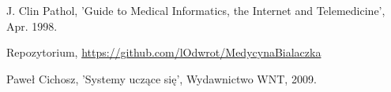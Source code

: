 \begin{thebibliography}{1}
	
	J. Clin Pathol, 'Guide to Medical Informatics, the Internet and Telemedicine', Apr. 1998. 
	
	Repozytorium, \url{https://github.com/lOdwrot/MedycynaBialaczka}
	
	Paweł Cichosz, 'Systemy uczące się', Wydawnictwo WNT, 2009. 
	
\end{thebibliography}